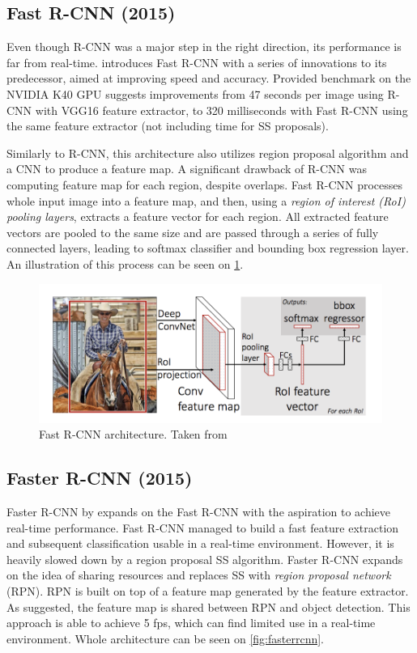 \subsection{Fast R-CNN (2015)}
Even though R-CNN was a major step in the right direction, its performance is far from real-time. \citeauthor{bib:fastrcnn} \cite{bib:fastrcnn} introduces Fast R-CNN with a series of innovations to its predecessor, aimed at improving speed and accuracy. Provided benchmark on the NVIDIA K40 GPU suggests improvements from 47 seconds per image using R-CNN with VGG16 feature extractor, to 320 milliseconds with Fast R-CNN using the same feature extractor (not including time for SS proposals). 

Similarly to R-CNN, this architecture also utilizes region proposal algorithm and a CNN to produce a feature map. A significant drawback of R-CNN was computing feature map for each region, despite overlaps. Fast R-CNN processes whole input image into a feature map, and then, using a \textit{region of interest (RoI) pooling layers}, extracts a feature vector for each region. All extracted feature vectors are pooled to the same size and are passed through a series of fully connected layers, leading to softmax classifier and bounding box regression layer. An illustration of this process can be seen on \cref{fig:fastrcnn}.

\begin{figure}
    \centering
    \includegraphics[width=\textwidth]{img/fastrcnn}
    \caption[Fast R-CNN architecture]%
    {Fast R-CNN architecture. Taken from \cite[fig. 1]{bib:fastrcnn}}
    \label{fig:fastrcnn}
\end{figure}

\subsection{Faster R-CNN (2015)}
 
Faster R-CNN by \citeauthor{bib:fasterrcnn} \cite{bib:fasterrcnn} expands on the Fast R-CNN with the aspiration to achieve real-time performance. Fast R-CNN managed to build a fast feature extraction and subsequent classification usable in a real-time environment. However, it is heavily slowed down by a region proposal SS algorithm. Faster R-CNN expands on the idea of sharing resources and replaces SS with \textit{region proposal network} (RPN). RPN is built on top of a feature map generated by the feature extractor. As suggested, the feature map is shared between RPN and object detection. This approach is able to achieve 5 fps, which can find limited use in a real-time environment. Whole architecture can be seen on \cref{fig:fasterrcnn}. 
 
